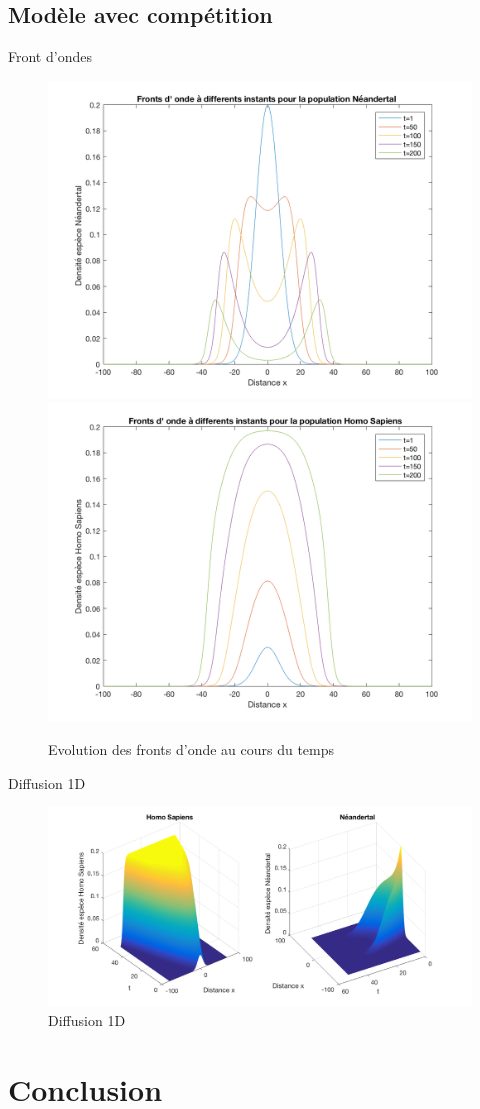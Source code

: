\documentclass[10pt]{beamer}
\begin{document}
\subsection{Modèle avec compétition}
\begin{frame}{Front d'ondes}{}
\begin{figure}[H]
\centering
\includegraphics[width=0.48\linewidth]{Comp/neand.png}
\includegraphics[width=0.48\linewidth]{Comp/homo.png}
\caption{Evolution des fronts d'onde au cours du temps}
\end{figure}
\end{frame}

\begin{frame}{Diffusion 1D}{}
\begin{figure}[H]
\centering
\includegraphics[scale=0.2]{Comp/CompDiff2.png}
\caption{Diffusion 1D}
\end{figure}
\end{frame}

\section{Conclusion}
\end{document}
